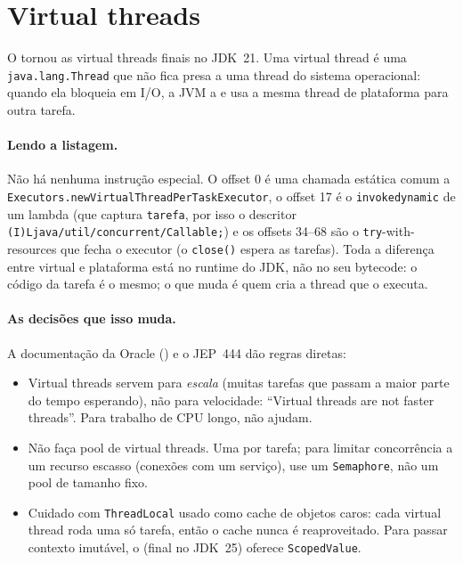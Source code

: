 \section{Virtual threads}
\label{sec:virtual-threads}

O  tornou as virtual threads finais no JDK~21. Uma
virtual thread é uma \texttt{java.lang.Thread} que não fica presa a uma
thread do sistema operacional: quando ela bloqueia em I/O, a JVM a
 e usa a mesma thread de
plataforma para outra tarefa.




\paragraph{Lendo a listagem.}
Não há nenhuma instrução especial. O offset 0 é uma chamada estática
comum a \texttt{Executors.newVirtualThreadPerTaskExecutor}, o offset 17
é o \texttt{invokedynamic} de um lambda (que captura \texttt{tarefa},
por isso o descritor \nolinkurl{(I)Ljava/util/concurrent/Callable;}) e os
offsets 34--68 são o \texttt{try}-with-resources que fecha o executor (o
\texttt{close()} espera as tarefas). Toda a diferença entre virtual e
plataforma está no runtime do JDK, não no seu bytecode: o código da
tarefa é o mesmo; o que muda é quem cria a thread que o executa.

\paragraph{As decisões que isso muda.}
A documentação da Oracle () e o
JEP~444 dão regras diretas:
\begin{itemize}
\item Virtual threads servem para \emph{escala} (muitas tarefas que passam
  a maior parte do tempo esperando), não para velocidade: \enquote{Virtual
  threads are not faster threads}. Para trabalho de CPU longo, não ajudam.
\item Não faça pool de virtual threads. Uma por tarefa; para limitar
  concorrência a um recurso escasso (conexões com um serviço), use um
  \texttt{Semaphore}, não um pool de tamanho fixo.
\item Cuidado com \texttt{ThreadLocal} usado como cache de objetos caros:
  cada virtual thread roda uma só tarefa, então o cache nunca é
  reaproveitado. Para passar contexto imutável, o
   (final no JDK~25) oferece \texttt{ScopedValue}.
\end{itemize}

